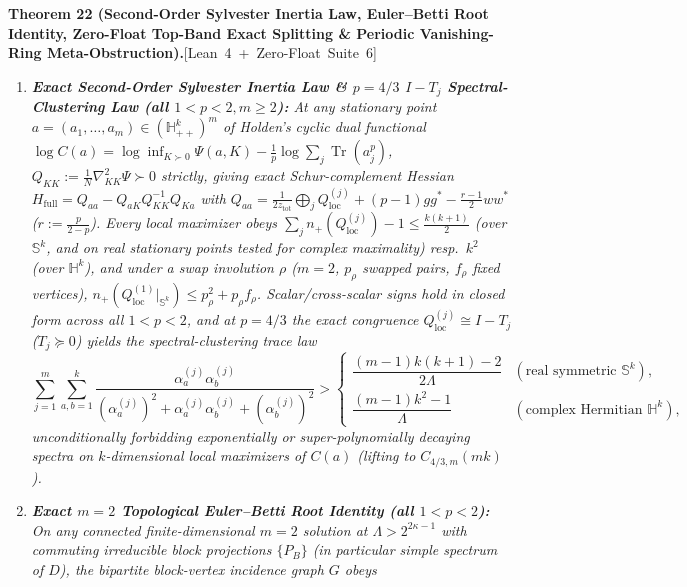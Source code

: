 \documentclass[10pt,letterpaper]{article}
\newcommand{\leanbadge}[1]{\mbox{\sffamily\scriptsize\color{leanborder}[#1]}}
\newcommand{\Tr}{\operatorname{Tr}}
\begin{document}
\begin{tcolorbox}[mathbox]
\textbf{Theorem 22 (Second-Order Sylvester Inertia Law, Euler--Betti Root Identity, Zero-Float Top-Band Exact Splitting \& Periodic Vanishing-Ring Meta-Obstruction).}\hfill\leanbadge{Lean~4 + Zero-Float Suite~6}\par\vspace{1.5pt}
\begin{enumerate}[label=(\alph*),leftmargin=1.8em,itemsep=2pt,topsep=2pt]
  \item \emph{\textbf{Exact Second-Order Sylvester Inertia Law \& $p = 4/3$ $I - T_j$ Spectral-Clustering Law (all $1 < p < 2, m \ge 2$):} At any stationary point $a = (a_1,\dots,a_m) \in (\mathbb{H}_{++}^k)^m$ of Holden's cyclic dual functional $\log C(a) = \log\inf_{K \succ 0}\Psi(a,K) - \frac{1}{p}\log\sum_j\Tr(a_j^p)$, $Q_{KK} := \frac{1}{N}\nabla^2_{KK}\Psi \succ 0$ strictly, giving exact Schur-complement Hessian $H_{\mathrm{full}} = Q_{aa} - Q_{aK}Q_{KK}^{-1}Q_{Ka}$ with $Q_{aa} = \frac{1}{2z_{\mathrm{tot}}}\bigoplus_j Q_{\mathrm{loc}}^{(j)} + (p-1)gg^* - \frac{r-1}{2}ww^*$ ($r := \frac{p}{2-p}$). Every local maximizer obeys $\sum_j n_+(Q_{\mathrm{loc}}^{(j)}) - 1 \le \frac{k(k+1)}{2}$ (over $\mathbb{S}^k$, and on real stationary points tested for complex maximality) resp.\ $k^2$ (over $\mathbb{H}^k$), and under a swap involution $\rho$ ($m=2$, $p_\rho$ swapped pairs, $f_\rho$ fixed vertices), $n_+(Q_{\mathrm{loc}}^{(1)}|_{\mathbb{S}^k}) \le p_\rho^2 + p_\rho f_\rho$. Scalar/cross-scalar signs hold in closed form across all $1 < p < 2$, and at $p = 4/3$ the exact congruence $Q_{\mathrm{loc}}^{(j)} \cong I - T_j$ ($T_j \succeq 0$) yields the spectral-clustering trace law}
  \begin{equation}\label{eq:spec_cluster}
    \sum_{j=1}^m \sum_{a,b=1}^k \frac{\alpha_a^{(j)}\alpha_b^{(j)}}{(\alpha_a^{(j)})^2 + \alpha_a^{(j)}\alpha_b^{(j)} + (\alpha_b^{(j)})^2}
    > \begin{cases}
      \dfrac{(m-1)k(k+1) - 2}{2\Lambda} & (\text{real symmetric }\mathbb{S}^k), \\[6pt]
      \dfrac{(m-1)k^2 - 1}{\Lambda} & (\text{complex Hermitian }\mathbb{H}^k),
    \end{cases}
  \end{equation}
  \emph{unconditionally forbidding exponentially or super-polynomially decaying spectra on $k$-dimensional local maximizers of $C(a)$ (lifting to $C_{4/3,m}(mk)$).}
  \item \emph{\textbf{Exact $m = 2$ Topological Euler--Betti Root Identity (all $1 < p < 2$):} On any connected finite-dimensional $m = 2$ solution at $\Lambda > 2^{2\kappa - 1}$ with commuting irreducible block projections $\{P_B\}$ (in particular simple spectrum of $D$), the bipartite block-vertex incidence graph $G$ obeys}

\end{enumerate}
\end{tcolorbox}
\end{document}
